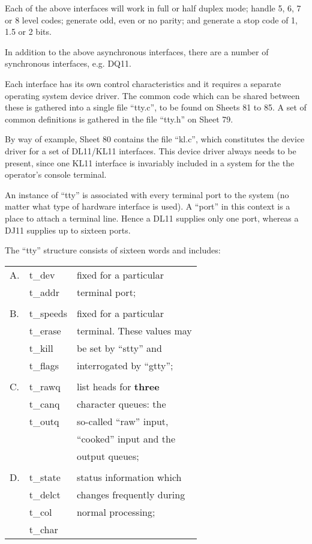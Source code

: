 Each of the above interfaces will work
in full or half duplex mode; handle 5,
6, 7 or 8 level codes; generate odd,
even or no parity; and generate a stop
code of 1, 1.5 or 2 bits.

In addition to the above asynchronous
interfaces, there are a number of synchronous interfaces, e.g. DQ11.

Each interface has its own control
characteristics and it requires a
separate operating system device
driver. The common code which can be
shared between these is gathered into a
single file ``tty.c'', to be found on
Sheets 81 to 85. A set of common definitions is gathered in the file ``tty.h''
on Sheet 79.

By way of example, Sheet 80 contains
the file ``kl.c'', which constitutes the
device driver for a set of DL11/KL11
interfaces. This device driver always
needs to be present, since one KL11
interface is invariably included in a
system for the the operator's console
terminal.


An instance of ``tty'' is associated with
every terminal port to the system (no
matter what type of hardware interface
is used). A ``port'' in this context is a
place to attach a terminal line. Hence
a DL11 supplies only one port, whereas
a DJ11 supplies up to sixteen ports.

The ``tty'' structure consists of sixteen
words and includes:

\noindent\begin{tabular}{lll}\\
A. & t\_dev & fixed for a particular \\
   & t\_addr & terminal port;\\
\\
B. &  t\_speeds & fixed for a particular \\
  & t\_erase & terminal. These values may \\
  & t\_kill & be set by ``stty'' and \\
  & t\_flags & interrogated by ``gtty''; \\
 \\
C. & t\_rawq & list heads for {\bf three} \\
  & t\_canq & character queues: the \\
  & t\_outq & so-called ``raw'' input, \\
 & & ``cooked'' input and the \\
 & & output queues; \\
 \\
D. & t\_state & status information which \\
  & t\_delct & changes frequently during \\
  & t\_col & normal processing; \\
  & t\_char & \\
\end{tabular}

